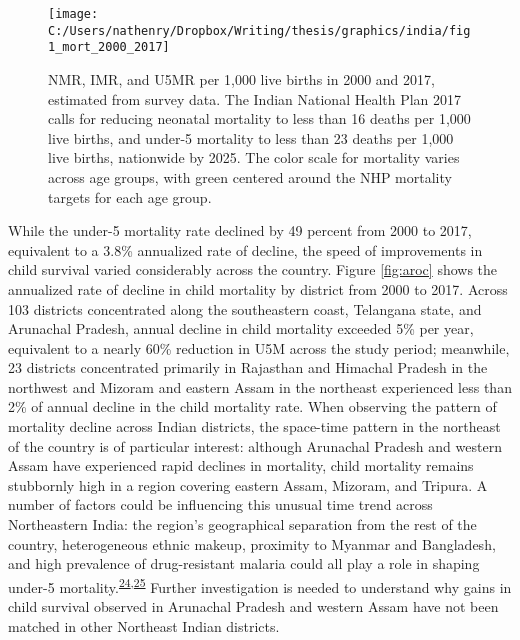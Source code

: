 \documentclass[
]{article}
\begin{document}
\begin{figure}[!hbt]

{\centering \texttt{[image: C:/Users/nathenry/Dropbox/Writing/thesis/graphics/india/fig1\_mort\_2000\_2017]} 

}

\caption{NMR, IMR, and U5MR per 1,000 live births in 2000 and 2017, estimated from survey data. The Indian National Health Plan 2017 calls for reducing neonatal mortality to less than 16 deaths per 1,000 live births, and under-5 mortality to less than 23 deaths per 1,000 live births, nationwide by 2025. The color scale for mortality varies across age groups, with green centered around the NHP mortality targets for each age group.}\label{fig:mort-summary}
\end{figure}

While the under-5 mortality rate declined by 49 percent from 2000 to 2017, equivalent to a 3.8\% annualized rate of decline, the speed of improvements in child survival varied considerably across the country. Figure \ref{fig:aroc} shows the annualized rate of decline in child mortality by district from 2000 to 2017. Across 103 districts concentrated along the southeastern coast, Telangana state, and Arunachal Pradesh, annual decline in child mortality exceeded 5\% per year, equivalent to a nearly 60\% reduction in U5M across the study period; meanwhile, 23 districts concentrated primarily in Rajasthan and Himachal Pradesh in the northwest and Mizoram and eastern Assam in the northeast experienced less than 2\% of annual decline in the child mortality rate. When observing the pattern of mortality decline across Indian districts, the space-time pattern in the northeast of the country is of particular interest: although Arunachal Pradesh and western Assam have experienced rapid declines in mortality, child mortality remains stubbornly high in a region covering eastern Assam, Mizoram, and Tripura. A number of factors could be influencing this unusual time trend across Northeastern India: the region's geographical separation from the rest of the country, heterogeneous ethnic makeup, proximity to Myanmar and Bangladesh, and high prevalence of drug-resistant malaria could all play a role in shaping under-5 mortality.\textsuperscript{\protect\hyperlink{ref-Ghosh2012}{24},\protect\hyperlink{ref-Zomuanpuii2020}{25}} Further investigation is needed to understand why gains in child survival observed in Arunachal Pradesh and western Assam have not been matched in other Northeast Indian districts.
\end{document}
